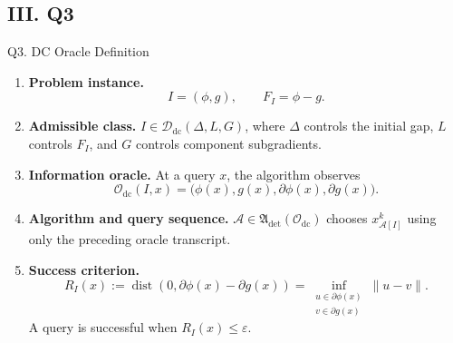 \documentclass[10pt]{beamer}
\begin{document}
\subsection{III. Q3}
\begin{frame}{Q3. DC Oracle Definition}
\footnotesize
\begin{enumerate}\setlength{\itemsep}{4pt}
    \item \textbf{Problem instance.}
    \[
        I=(\phi,g),\qquad F_I=\phi-g.
    \]

    \item \textbf{Admissible class.}
    $I\in\mathcal D_{\mathrm{dc}}(\Delta,L,G)$, where $\Delta$ controls the
    initial gap, $L$ controls $F_I$, and $G$ controls component subgradients.

    \item \textbf{Information oracle.}
    At a query $x$, the algorithm observes
    \[
        \mathcal O_{\mathrm{dc}}(I,x)
        =\bigl(\phi(x),g(x),\partial\phi(x),\partial g(x)\bigr).
    \]

    \item \textbf{Algorithm and query sequence.}
    $\mathcal A\in\mathfrak A_{\mathrm{det}}(\mathcal O_{\mathrm{dc}})$ chooses
    $x_{\mathcal A[I]}^k$ using only the preceding oracle transcript.

    \item \textbf{Success criterion.}
    \[
    R_I(x):=\operatorname{dist}\!\left(0,\partial\phi(x)-\partial g(x)\right)
    =\inf_{\substack{u\in\partial\phi(x)\\v\in\partial g(x)}}\|u-v\|.
    \]
    A query is successful when $R_I(x)\le\varepsilon$.
\end{enumerate}
\end{frame}
\end{document}
